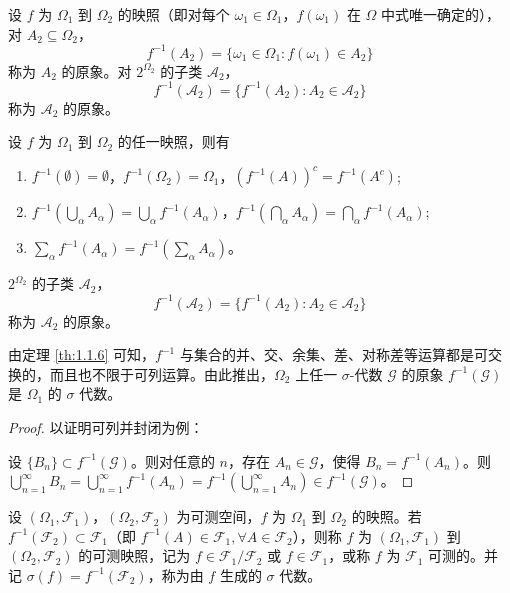 \documentclass[lang=cn,10pt,thmcnt=section]{elegantbook}
\begin{document}
\begin{definition}
	设 \(f\) 为 \(\Omega_1\) 到 \(\Omega_2\) 的映照（即对每个 \(\omega_1 \in \Omega_1\)，\(f(\omega_1)\) 在 \(\Omega\) 中式唯一确定的），对 \(A_2 \subseteq \Omega_2\)，
\[
f^{-1}(A_2) = \{\omega_1 \in \Omega_1 : f(\omega_1) \in A_2\}
\]
称为 \(A_2\) 的原象。对 \(2^{\Omega_2}\) 的子类 \(\mathscr{A}_2\)，
\[
f^{-1}(\mathscr{A}_2) = \{f^{-1}(A_2) : A_2 \in \mathscr{A}_2\}
\]
称为 \(\mathscr{A}_2\) 的原象。
\end{definition}
\begin{theorem}\label{th:1.1.6}
	设 \(f\) 为 \(\Omega_1\) 到 \(\Omega_2\) 的任一映照，则有
\begin{enumerate}
    \item \(f^{-1}(\emptyset) = \emptyset\)，\(f^{-1}(\Omega_2) = \Omega_1\)，\((f^{-1}(A))^c = f^{-1}(A^c)\);
    \item \(f^{-1}(\bigcup_\alpha A_\alpha) = \bigcup_\alpha f^{-1}(A_\alpha)\)，\(f^{-1}(\bigcap_\alpha A_\alpha) = \bigcap_\alpha f^{-1}(A_\alpha)\);
    \item \(\sum_\alpha f^{-1}(A_\alpha) = f^{-1}(\sum_\alpha A_\alpha)\)。
\end{enumerate}

\(2^{\Omega_2}\) 的子类 \(\mathscr{A}_2\)，
\[
f^{-1}(\mathscr{A}_2) = \{f^{-1}(A_2) : A_2 \in \mathscr{A}_2\}
\]
称为 \(\mathscr{A}_2\) 的原象。
\end{theorem}
\begin{theorem}
	由定理 \ref{th:1.1.6} 可知，\(f^{-1}\) 与集合的并、交、余集、差、对称差等运算都是可交换的，而且也不限于可列运算。由此推出，\(\Omega_2\) 上任一 \(\sigma\)-代数 \(\mathscr{G}\) 的原象 \(f^{-1}(\mathscr{G})\) 是 \(\Omega_1\) 的 \(\sigma\) 代数。
\end{theorem}

\begin{proof}
	以证明可列并封闭为例：
 
设 \(\{B_n\} \subset f^{-1}(\mathscr{G})\)。则对任意的 \(n\)，存在 \(A_n \in \mathscr{G}\)，使得 \(B_n = f^{-1}(A_n)\)。则 \(\bigcup_{n=1}^{\infty} B_n = \bigcup_{n=1}^{\infty} f^{-1}(A_n) = f^{-1}(\bigcup_{n=1}^{\infty} A_n) \in f^{-1}(\mathscr{G})\)。
\end{proof}
\begin{definition}
	设 \((\Omega_1, \mathscr{F}_1)\)，\((\Omega_2, \mathscr{F}_2)\) 为可测空间，\(f\) 为 \(\Omega_1\) 到 \(\Omega_2\) 的映照。若 \(f^{-1}(\mathscr{F}_2) \subset \mathscr{F}_1\)（即 \(f^{-1}(A) \in \mathscr{F}_1, \forall A \in \mathscr{F}_2\)），则称 \(f\) 为 \((\Omega_1, \mathscr{F}_1)\) 到 \((\Omega_2, \mathscr{F}_2)\) 的可测映照，记为 \(f \in \mathscr{F}_1/\mathscr{F}_2\) 或 \(f \in \mathscr{F}_1\)，或称 \(f\) 为 \(\mathscr{F}_1\) 可测的。并记 \(\sigma(f) = f^{-1}(\mathscr{F}_2)\)，称为由 \(f\) 生成的 \(\sigma\) 代数。
\end{definition}
\end{document}
